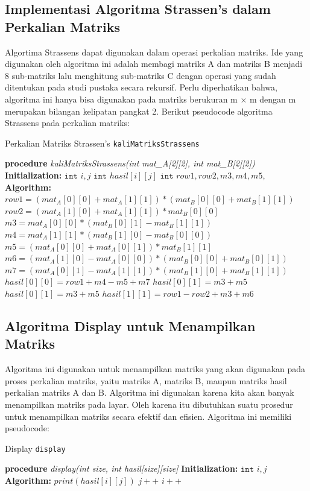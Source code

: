 \documentclass[conference]{IEEEtran}
\begin{document}
\subsection{Implementasi Algoritma Strassen's dalam Perkalian Matriks}
Algortima Strassens dapat digunakan dalam operasi perkalian matriks.
Ide yang digunakan oleh algoritma ini adalah membagi matriks A dan matriks B
menjadi 8 sub-matriks lalu menghitung sub-matriks C dengan operasi yang sudah ditentukan
pada studi pustaka secara rekursif. Perlu diperhatikan bahwa, algoritma ini hanya bisa 
digunakan pada matriks berukuran m $\times$ m dengan m merupakan bilangan kelipatan
pangkat 2. Berikut pseudocode algoritma Strassens pada perkalian matriks:

\begin{algorithm}
    \caption{Perkalian Matriks Strassen's \texttt{kaliMatriksStrassens}}\label{alg:three}
    \DontPrintSemicolon
    \textbf{procedure} \emph{kaliMatriksStrassens(int mat\_A[2][2], int mat\_B[2][2])}\;
    \textbf{Initialization:}\;
    $ \texttt{int } i,j $\;
    $ \texttt{int } hasil[i][j]$\;
    $ \texttt{int } row1, row2, m3, m4, m5,  $\;
    \textbf{Algorithm:}\;
    $row1= (mat_A[0][0] + mat_A[1][1]) * (mat_B[0][0] + mat_B[1][1]) $\;
    $row2= (mat_A[1][0] + mat_A[1][1]) * mat_B[0][0] $\;
    $m3= mat_A[0][0] * (mat_B[0][1] - mat_B[1][1]) $\;
    $m4= mat_A[1][1] * (mat_B[1][0] - mat_B[0][0]) $\;
    $m5= (mat_A[0][0] + mat_A[0][1]) * mat_B[1][1] $\;\
    $m6= (mat_A[1][0] - mat_A[0][0]) * (mat_B[0][0]+mat_B[0][1]) $\;
    $m7= (mat_A[0][1] - mat_A[1][1]) * (mat_B[1][0]+mat_B[1][1]) $\;
    $ $\;
    $hasil[0][0] = row1 + m4- m5 + m7$\;
    $hasil[0][1] = m3 + m5 $\;
    $hasil[0][1] = m3 + m5 $\;
    $hasil[1][1] = row1 - row2 + m3 + m6 $\; 
\end{algorithm}

\subsection{Algoritma Display untuk Menampilkan Matriks}
Algoritma ini digunakan untuk menampilkan matriks yang akan digunakan pada proses perkalian
matriks, yaitu matriks A, matriks B, maupun matriks hasil perkalian matriks A dan B. Algoritma ini
digunakan karena kita akan banyak menampilkan matriks pada layar. Oleh karena itu dibutuhkan suatu
prosedur untuk menampilkan matriks secara efektif dan efisien. Algoritma ini memiliki pseudocode:

\begin{algorithm}
    \caption{Display \texttt{display}}\label{alg:four}
    \DontPrintSemicolon
    \textbf{procedure} \emph{display(int size, int hasil[size][size]}\;
    \textbf{Initialization:}\;
    $ \texttt{int } i,j $\;
    \textbf{Algorithm:}\;
     {
         {
            $print(hasil[i][j])$\;
            $j++$\;
        }
        $i++$\;
    }
\end{algorithm}
\end{document}

